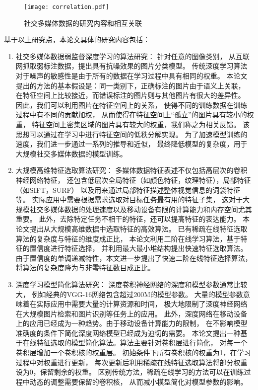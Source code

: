 \begin{figure}[ht]
\centering
\texttt{[image: correlation.pdf]}
\caption{社交多媒体数据的研究内容和相互关联}
\label{fig:correlation}
\end{figure}

基于以上研究点，本论文具体的研究内容包括：
\begin{enumerate}[{(1)}]
    \item 社交多媒体数据弱监督深度学习的算法研究： 针对任意的图像类别，
        从互联网抓取弱标注数据，提出具有抗噪效果的图片分类模型。
        传统深度学习算法对于噪声的敏感性是由于所有的数据在学习过程中具有相同的权重。
        本论文提出的方法的基本假设是：同一类别下，正确标注的图片由于语义上关联，
        在特征空间上比较接近，而错误标注的图片则与其他图片有很大的差异性。
        因此，我们可以利用图片在特征空间上的关系，
        使得不同的训练数据在训练过程中有不同的贡献加权，
        从而使得在特征空间上“孤立”的图片具有较小的权重，
        特征空间上密集区域的图片具有较大的权重，我们称之为相关反馈。
        该思想可以通过在学习中进行特征空间的低秩分解实现。
        为了加速模型训练的速度，我们进一步通过一系列的推导和近似，
        最终降低模型的复杂度，用于大规模社交多媒体数据的模型训练。

    \item 大规模高维特征选取算法研究：
        多媒体数据特征表述不仅包括高层次的卷积神经网络特征，
        还包含低层次全局特征（如颜色特征，纹理特征），局部特征（如SIFT，SURF）
        以及用来通过局部特征描述整体视觉信息的词袋特征等。
        实际应用中需要根据需求选取对目标任务最有用的特征子集，
        这对于大规模社交多媒体数据的处理速度以及移动设备有限的计算能力和内存空间尤其重要。
        此外，去除特定任务不相干的特征，还可以提高特征的表达能力。
        本论文提出从大规模高维数据中选取特征的高效算法。
        已有稀疏在线特征选取算法的复杂度与特征的维度成正比，
        本论文利用二阶在线学习算法，基于特征的置信度进行特征选择，
        并利用最大最小堆结构提出快速特征选取算法。
        由于置信度的单调递减特性，本文进一步提出了快速二阶在线特征选择算法，
        将算法的复杂度降为与非零特征数目成正比。

    \item 深度学习模型简化算法研究：
        深度卷积神经网络的深度和模型参数通常比较大，
        例如经典的VGG-16网络包含超过200M的模型参数。
        大量的模型参数意味着在实际应用中需要大量的计算资源和时间，
        极大地限制了深度神经网络在大规模图片检索和图片识别等任务上的应用。
        此外，深度网络在移动设备上的应用已经成为一种趋势。由于移动设备计算能力的限制，
        在不影响模型准确度的条件下简化深度网络模型已经成为迫切的需要。
        本论文提出一种基于在线特征选取的模型简化算法。算法主要针对卷积层进行简化，
        对每一个卷积层增加一个卷积核的权重层。
        初始条件下所有卷积核的权重为1，在学习过程中对权重进行更新，
        每次更新后利用稀疏在线特征选取算法将部分权重设为0，保留剩余的权重。
        区别传统方法，稀疏在线学习的方法可以在训练过程中动态的调整需要保留的卷积核，
        从而减小模型简化对模型参数的影响。


\end{enumerate}
